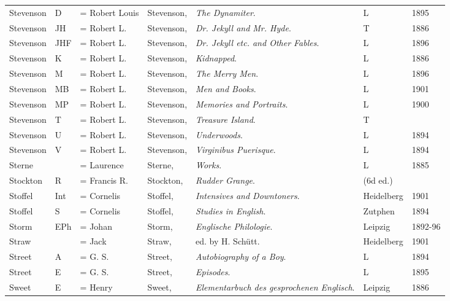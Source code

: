 \begin{sidewaystable}
\centering\small
\begin{tabular}{p{} p{} p{} p{} p{} p{} p{}}
Stevenson & D & = Robert Louis & Stevenson, & \textit{The Dynamiter}. & L & 1895 \\
Stevenson & JH & = Robert L. & Stevenson, & \textit{Dr. Jekyll and Mr. Hyde}. & T & 1886 \\
Stevenson & JHF & = Robert L. & Stevenson, & \textit{Dr. Jekyll etc. and Other Fables}. & L & 1896 \\
Stevenson & K & = Robert L. & Stevenson, & \textit{Kidnapped}. & L & 1886 \\
Stevenson & M & = Robert L. & Stevenson, & \textit{The Merry Men}. & L & 1896 \\
Stevenson & MB & = Robert L. & Stevenson, & \textit{Men and Books}. & L & 1901 \\
Stevenson & MP & = Robert L. & Stevenson, & \textit{Memories and Portraits}. & L & 1900 \\
Stevenson & T & = Robert L. & Stevenson, & \textit{Treasure Island}. & T & \\
Stevenson & U & = Robert L. & Stevenson, & \textit{Underwoods}. & L & 1894 \\
Stevenson & V & = Robert L. & Stevenson, & \textit{Virginibus Puerisque}. & L & 1894 \\
Sterne & & = Laurence & Sterne, & \textit{Works}. & L & 1885 \\
Stockton & R & = Francis R. & Stockton, & \textit{Rudder Grange}. & (6d ed.) & \\
Stoffel & Int & = Cornelis & Stoffel, & \textit{Intensives and Downtoners}. & Heidelberg & 1901 \\
Stoffel & S & = Cornelis & Stoffel, & \textit{Studies in English}. & Zutphen & 1894 \\
Storm & EPh & = Johan & Storm, & \textit{Englische Philologie}. & Leipzig & 1892-96 \\
Straw & & = Jack & Straw, & ed. by H. Schütt. & Heidelberg & 1901 \\
Street & A & = G. S. & Street, & \textit{Autobiography of a Boy}. & L & 1894 \\
Street & E & = G. S. & Street, & \textit{Episodes}. & L & 1895 \\
Sweet & E & = Henry & Sweet, & \textit{Elementarbuch des gesprochenen Englisch}. & Leipzig & 1886 \\

\end{tabular}
\end{sidewaystable}

